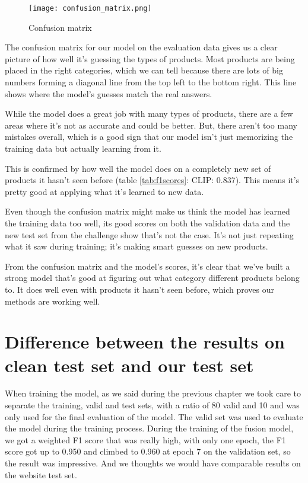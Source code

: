 \begin{figure}[H]
	\centering
	\texttt{[image: confusion\_matrix.png]}
	\caption{Confusion matrix}
	\label{fig:confusionmatrix}
\end{figure}

The confusion matrix for our model on the evaluation data gives us a clear picture of how well it's guessing the types of products. Most products are being placed in the right categories, which we can tell because there are lots of big numbers forming a diagonal line from the top left to the bottom right. This line shows where the model's guesses match the real answers.

While the model does a great job with many types of products, there are a few areas where it's not as accurate and could be better. But, there aren't too many mistakes overall, which is a good sign that our model isn't just memorizing the training data but actually learning from it.

This is confirmed by how well the model does on a completely new set of products it hasn't seen before (table \ref*{tab:f1scores}: CLIP: 0.837). This means it's pretty good at applying what it's learned to new data.

Even though the confusion matrix might make us think the model has learned the training data too well, its good scores on both the validation data and the new test set from the challenge show that's not the case. It's not just repeating what it saw during training; it's making smart guesses on new products.

From the confusion matrix and the model's scores, it's clear that we've built a strong model that's good at figuring out what category different products belong to. It does well even with products it hasn't seen before, which proves our methods are working well.


\section{Difference between the results on clean test set and our test set}
When training the model, as we said during the previous chapter we took care
to separate the training, valid and test sets, with a ratio of 80%
valid and 10%
and was only used for the final evaluation of the model. The valid set was used
to evaluate the model during the training process. During the training of the
fusion model, we got a weighted F1 score that was really high, with only one
epoch, the F1 score got up to 0.950 and climbed to 0.960 at epoch 7 on the
validation set, so the result was impressive. And we thoughts we would have
comparable results on the website test set.

